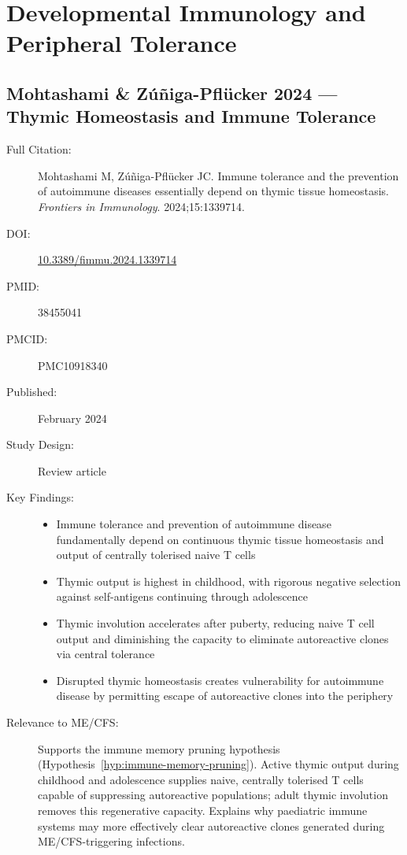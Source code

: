 \section{Developmental Immunology and Peripheral Tolerance}
\label{sec:bib-developmental-immunology}

\subsection{Mohtashami \& Zúñiga-Pflücker 2024 --- Thymic Homeostasis and Immune Tolerance}

\begin{description}
    \item[Full Citation:] Mohtashami M, Zúñiga-Pflücker JC. Immune tolerance and the prevention of autoimmune diseases essentially depend on thymic tissue homeostasis. \textit{Frontiers in Immunology}. 2024;15:1339714.
    \item[DOI:] \href{https://doi.org/10.3389/fimmu.2024.1339714}{10.3389/fimmu.2024.1339714}
    \item[PMID:] 38455041
    \item[PMCID:] PMC10918340
    \item[Published:] February 2024
    \item[Study Design:] Review article
    \item[Key Findings:]
    \begin{itemize}
        \item Immune tolerance and prevention of autoimmune disease fundamentally depend on continuous thymic tissue homeostasis and output of centrally tolerised naive T cells
        \item Thymic output is highest in childhood, with rigorous negative selection against self-antigens continuing through adolescence
        \item Thymic involution accelerates after puberty, reducing naive T cell output and diminishing the capacity to eliminate autoreactive clones via central tolerance
        \item Disrupted thymic homeostasis creates vulnerability for autoimmune disease by permitting escape of autoreactive clones into the periphery
    \end{itemize}
    \item[Relevance to ME/CFS:] Supports the immune memory pruning hypothesis (Hypothesis~\ref{hyp:immune-memory-pruning}). Active thymic output during childhood and adolescence supplies naive, centrally tolerised T cells capable of suppressing autoreactive populations; adult thymic involution removes this regenerative capacity. Explains why paediatric immune systems may more effectively clear autoreactive clones generated during ME/CFS-triggering infections.

\end{description}

